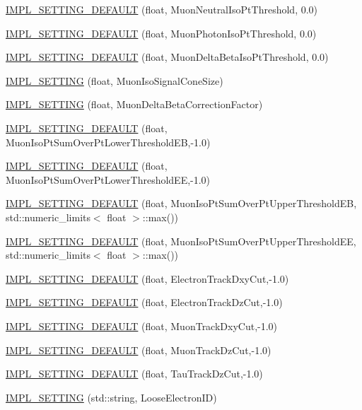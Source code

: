 \begin{DoxyCompactItemize}
\item 
\hyperlink{classHttSettings_a4a6545c4cd73b0d854bedd023245d66f}{IMPL\_\-SETTING\_\-DEFAULT} (float, MuonNeutralIsoPtThreshold, 0.0)
\item 
\hyperlink{classHttSettings_a6adfeaa92e8c8d17902e017089ff014c}{IMPL\_\-SETTING\_\-DEFAULT} (float, MuonPhotonIsoPtThreshold, 0.0)
\item 
\hyperlink{classHttSettings_a8001c74f4fbc97854d11ac2ef6cb62b7}{IMPL\_\-SETTING\_\-DEFAULT} (float, MuonDeltaBetaIsoPtThreshold, 0.0)
\item 
\hyperlink{classHttSettings_a15a54c3d01ca1b2297236e75b041f840}{IMPL\_\-SETTING} (float, MuonIsoSignalConeSize)
\item 
\hyperlink{classHttSettings_a380239bb554b50cec815a31e4947e978}{IMPL\_\-SETTING} (float, MuonDeltaBetaCorrectionFactor)
\item 
\hyperlink{classHttSettings_a7f40ee4aa5036838cfa60ece75e7bf8e}{IMPL\_\-SETTING\_\-DEFAULT} (float, MuonIsoPtSumOverPtLowerThresholdEB,-\/1.0)
\item 
\hyperlink{classHttSettings_a7758be711fa73d2ae7f189cc3d756a50}{IMPL\_\-SETTING\_\-DEFAULT} (float, MuonIsoPtSumOverPtLowerThresholdEE,-\/1.0)
\item 
\hyperlink{classHttSettings_ac14bc12887f53356e62898136bd2e65b}{IMPL\_\-SETTING\_\-DEFAULT} (float, MuonIsoPtSumOverPtUpperThresholdEB, std::numeric\_\-limits$<$ float $>$::max())
\item 
\hyperlink{classHttSettings_adee678dc804dcbbe8fcf8a8bb1522c66}{IMPL\_\-SETTING\_\-DEFAULT} (float, MuonIsoPtSumOverPtUpperThresholdEE, std::numeric\_\-limits$<$ float $>$::max())
\item 
\hyperlink{classHttSettings_a10cb15cf8b50311d87ac387cc9ad182d}{IMPL\_\-SETTING\_\-DEFAULT} (float, ElectronTrackDxyCut,-\/1.0)
\item 
\hyperlink{classHttSettings_aab852c525e62354d9c6efa3d56612087}{IMPL\_\-SETTING\_\-DEFAULT} (float, ElectronTrackDzCut,-\/1.0)
\item 
\hyperlink{classHttSettings_a600c2c10faad6847cf76443c5688adb3}{IMPL\_\-SETTING\_\-DEFAULT} (float, MuonTrackDxyCut,-\/1.0)
\item 
\hyperlink{classHttSettings_a96cfe871dd9a2c337515ce0aa689834c}{IMPL\_\-SETTING\_\-DEFAULT} (float, MuonTrackDzCut,-\/1.0)
\item 
\hyperlink{classHttSettings_a9bf4264eeee3192afdd65acdb6806ef4}{IMPL\_\-SETTING\_\-DEFAULT} (float, TauTrackDzCut,-\/1.0)
\item 
\hyperlink{classHttSettings_a9d4d24f41e2b5122dbce2e7df7b2ed39}{IMPL\_\-SETTING} (std::string, LooseElectronID)

\end{DoxyCompactItemize}
